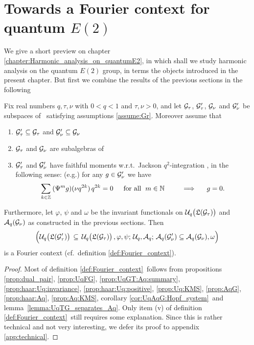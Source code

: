 
\section{Towards a Fourier context for quantum $E(2)$}
\label{par:Preview_on_Fourier_transforms}


\begin{abs_chp*}
We give a short preview on chapter \ref{chapter:Harmonic_analysis_on_quantumE2},
in which shall we study harmonic analysis on the quantum $E(2)$ group,
in terms the objects introduced in the present chapter.
But first we combine the results of the previous sections in the following
\end{abs_chp*}



\begin{thm_sec} \label{thm:combine_results}
Fix real numbers\/ $q,\tau,\nu$ with\/ $0<q<1$ and\/ $\tau,\nu >0$, and let\/
$\mathcal G_\tau$, $\mathcal G_\tau'$, $\mathcal G_\nu$ and\/ $\mathcal G_\nu'$ be subspaces of\/ \HC\ satisfying
assumptions \ref{assume:Gr}\@. Moreover assume that
%
\begin{enumerate}
\item
$\mathcal G_\tau' \subseteq \mathcal G_\tau$ and\/ $\mathcal G_\nu' \subseteq \mathcal G_\nu$
\item
$\mathcal G_\tau$ and\/ $\mathcal G_\nu$ are subalgebras of\/ \HC
\item
$\mathcal G_\tau'$ and\/ $\mathcal G_\nu'$ have faithful moments w.r.t.\ Jackson
$q^2$-integration \cite{Koornwinder}, in the following sense: (e.g.)
for any\/ $g\in \mathcal G_\nu'$ we have
$$ \sum_{k\in\mathbb{Z}} \: (\Psi^m g)(\nu q^{2k})\, q^{2k} = 0
       \hspace{1.5em}  \mbox{for all\ }  \; m\in \mathbb{N}
       \hspace{2.5em}  \Longrightarrow  \hspace{1.5em}  g=0. $$
\end{enumerate}
%
Furthermore, let\/ $\varphi$, $\psi$ and\/ $\omega$ be the invariant functionals on\/
$\UqTG$ and\/ ${\mathcal A}_q(\mathcal G_\nu)$ as constructed in the previous sections. Then
$$ \left(\Uq\!\left(\calL(\Gtau')\vertM\right)\, \subseteq \,\UqTG, \varphi, \psi;
         \, \Uq, \Aq; \,
      \Aq(\calG_\nu') \subseteq \Aq(\calG_\nu), \omega \vertL \right) $$
is a Fourier context (cf.\ definition \ref{def:Fourier_context}).
\end{thm_sec}


\begin{proof}
Most of definition \ref{def:Fourier_context}\ follows from
propositions \ref{prop:dual_pair}, \ref{prop:UqFG}, \ref{prop:UqGT:Aq:summary},
\ref{prop:haar:Uq:invariance}, \ref{prop:haar:Uq:positive}, \ref{prop:Uq:KMS},
\ref{prop:AqG}, \ref{prop:haar:Aq}, \ref{prop:Aq:KMS}, corollary
\ref{cor:UqAqG:Hopf_system}\ and \mbox{lemma \ref{lemma:UqTG_separates_Aq}}\@.
Only item (v) of definition \ref{def:Fourier_context}\ still
requires some explanation. Since this is rather technical and not
very interesting, we defer its proof to appendix \ref{app:technical}.
\end{proof}
\vspace{2ex}



